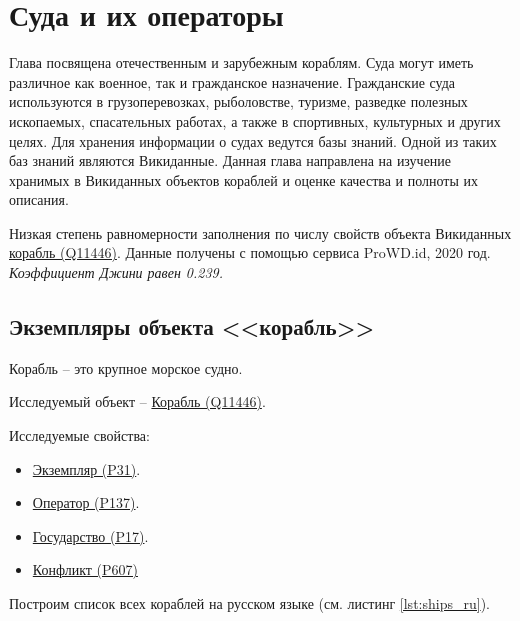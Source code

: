 \chapter{Суда и их операторы}
\label{ch:ships-chapter}

Глава посвящена отечественным и зарубежным кораблям. Суда могут иметь различное как военное, так и гражданское назначение. Гражданские суда используются в грузоперевозках, рыболовстве, туризме, разведке полезных ископаемых, спасательных работах, а также в спортивных, культурных и других целях. Для хранения информации о судах ведутся базы знаний. Одной из таких баз знаний являются Викиданные. Данная глава направлена на изучение хранимых в Викиданных объектов кораблей и оценке качества и полноты их описания.


\begin{marginfigure}[0.0cm]
  {
    \setlength{\fboxsep}{0pt}%
    \setlength{\fboxrule}{1pt}%
  }
  \caption{
    Низкая степень равномерности заполнения по числу свойств объекта Викиданных \href{https://www.wikidata.org/wiki/Q11446}{корабль (Q11446)}.  Данные получены с помощью сервиса ProWD.id, 2020 год. \emph{Коэффициент Джини равен 0.239.}
    }%
    \label{fig:prowd_ships-unbalanced}%
  \end{marginfigure}


\section{Экземпляры объекта <<корабль>>}

Корабль -- это крупное морское судно.

Исследуемый объект -- \href{https://www.wikidata.org/wiki/Q11446}{Корабль (Q11446)}.

Исследуемые свойства:
\begin{itemize}
  \item \href{https://www.wikidata.org/wiki/Property:P31}{Экземпляр (P31)}.
  \item \href{https://www.wikidata.org/wiki/Property:P137}{Оператор (P137)}.
  \item \href{https://www.wikidata.org/wiki/Property:P17}{Государство (P17)}.
  \item \href{https://www.wikidata.org/wiki/Property:P607}{Конфликт (P607)}
\end{itemize}

Построим список всех кораблей на русском языке (см. листинг \ref{lst:ships_ru}).

